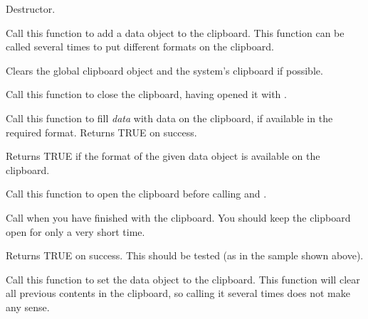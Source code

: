 

Destructor.

\label{wxclipboardadddata}


Call this function to add a data object to the clipboard. This function can be called several times
to put different formats on the clipboard.

\label{wxclipboardclear}


Clears the global clipboard object and the system's clipboard if possible.

\label{wxclipboardclose}


Call this function to close the clipboard, having opened it with .

\label{wxclipboardgetdata}


Call this function to fill {\it data} with data on the clipboard, if available in the required
format. Returns TRUE on success.

\label{wxclipboardissupported}


Returns TRUE if the format of the given data object is available on the clipboard.

\label{wxclipboardopen}


Call this function to open the clipboard before calling  
and .

Call  when you have finished with the clipboard. You
should keep the clipboard open for only a very short time.

Returns TRUE on success. This should be tested (as in the sample shown above).

\label{wxclipboardsetdata}


Call this function to set the data object to the clipboard. This function will
clear all previous contents in the clipboard, so calling it several times
does not make any sense.

